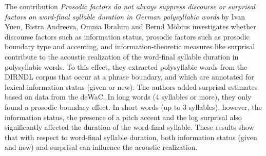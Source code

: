 \documentclass[output=paper,colorlinks,citecolor=brown]{langscibook}
\begin{document}
The contribution \textit{Prosodic factors do not always suppress discourse or surprisal factors on word-final syllable duration in German
polysyllabic words} by Ivan Yuen, Bistra Andreeva, Omnia Ibrahim and Bernd Möbius investigates whether discourse factors such as information status, prosodic factors such as prosodic boundary type and accenting, and information-theoretic measures like surprisal contribute to the acoustic realization of the word-final syllable duration in polysyllabic words. To this effect, they extracted polysyllabic words from the DIRNDL corpus that occur at a phrase boundary, and which are annotated for lexical information status (given or new). The authors added surprisal estimates based on data from the deWaC. In long words (4 syllables or more),  they only found a prosodic boundary effect. In short words (up to 3 syllables), however, the information status, the presence of a pitch accent and the log surprisal also significantly affected the duration of the word-final syllable. These results show that with respect to word-final syllable duration, both information status (given and new) and surprisal can influence the acoustic realization.

% 
% 
% 
% 
% 


{\printbibliography[heading=subbibliography,notkeyword=this]}
\end{document}
